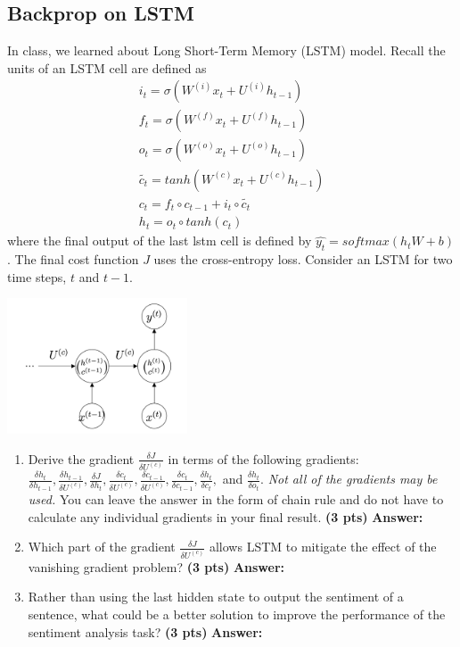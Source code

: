 \documentclass{assignment format}
\newenvironment{answer}{
    {\bf Answer:} \begingroup\color{red}
}{\endgroup}%
\begin{document}
\subsection{Backprop on LSTM}
In class, we learned about Long Short-Term Memory (LSTM) model. Recall the units of an LSTM cell are defined as
\begin{align*}
i_{t}=\sigma(W^{(i)}x_{t} + U^{(i)}h_{t-1})\\
f_{t}=\sigma(W^{(f)}x_{t} + U^{(f)}h_{t-1})\\
o_{t}=\sigma(W^{(o)}x_{t} + U^{(o)}h_{t-1})\\
\tilde{c_{t}} = tanh(W^{(c)}x_{t} + U^{(c)}h_{t-1})\\
c_{t} = f_{t}\circ c_{t-1}+i_{t}\circ \tilde{c_{t}}\\
h_{t}=o_{t}\circ tanh(c_{t})
\end{align*}
where the final output of the last lstm cell is defined by $\hat{y_{t}}=softmax(h_{t}W+b)$. The final cost function $J$ uses the cross-entropy loss. Consider an LSTM for two time steps, $t$ and $t-1$.
    \begin{center}
        \captionsetup{width=0.4\textwidth}
        \includegraphics[width=0.4\textwidth]{LSTM.png}
        \label{LSTM-figure}
    \end{center}
\begin{enumerate}[label=(\alph*)]
    \item Derive the gradient $\frac{\delta J}{\delta U^{(c)}}$ in terms of the following gradients: $\frac{\delta h_{t}}{\delta h_{t-1}}, \frac{\delta h_{t-1}}{\delta U^{(c)}}, \frac{\delta J}{\delta h_{t}}, \frac{\delta c_{t}}{\delta U^{(c)}}, \frac{\delta c_{t-1}}{\delta U^{(c)}}, \frac{\delta c_{t}}{\delta c_{t-1}}, \frac{\delta h_{t}}{\delta c_{t}},$ and $\frac{\delta h_{t}}{\delta o_{t}}$. \textit{Not all of the gradients may be used.} You can leave the answer in the form of chain rule and do not have to calculate any individual gradients in your final result. \textbf{(3 pts)}
    \begin{answer}
    \end{answer}
    \item Which part of the gradient $\frac{\delta J}{\delta U^{(c)}}$ allows LSTM to mitigate the effect of the vanishing gradient problem? \textbf{(3 pts)}
    \begin{answer}
    \end{answer}
    \item Rather than using the last hidden state to output the sentiment of a sentence, what could be a better solution to improve the performance of the sentiment analysis task? \textbf{(3 pts)}
    \begin{answer}
    \end{answer}
\end{enumerate}
\end{document}
